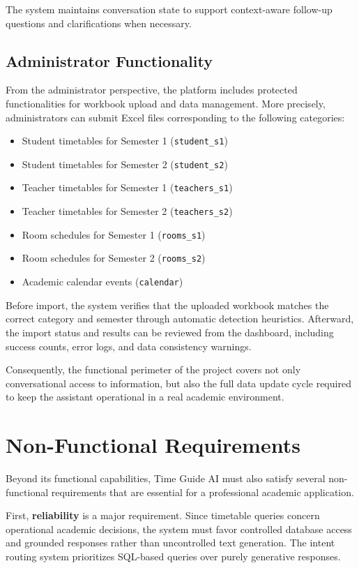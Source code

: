 The system maintains conversation state to support context-aware follow-up questions and clarifications when necessary.

\subsection{Administrator Functionality}
From the administrator perspective, the platform includes protected functionalities for workbook upload and data management. More precisely, administrators can submit Excel files corresponding to the following categories:

\begin{itemize}
    \item Student timetables for Semester 1 (\texttt{student\_s1})
    \item Student timetables for Semester 2 (\texttt{student\_s2})
    \item Teacher timetables for Semester 1 (\texttt{teachers\_s1})
    \item Teacher timetables for Semester 2 (\texttt{teachers\_s2})
    \item Room schedules for Semester 1 (\texttt{rooms\_s1})
    \item Room schedules for Semester 2 (\texttt{rooms\_s2})
    \item Academic calendar events (\texttt{calendar})
\end{itemize}

Before import, the system verifies that the uploaded workbook matches the correct category and semester through automatic detection heuristics. Afterward, the import status and results can be reviewed from the dashboard, including success counts, error logs, and data consistency warnings.

Consequently, the functional perimeter of the project covers not only conversational access to information, but also the full data update cycle required to keep the assistant operational in a real academic environment.

\section{Non-Functional Requirements}
Beyond its functional capabilities, Time Guide AI must also satisfy several non-functional requirements that are essential for a professional academic application.

First, \textbf{reliability} is a major requirement. Since timetable queries concern operational academic decisions, the system must favor controlled database access and grounded responses rather than uncontrolled text generation. The intent routing system prioritizes SQL-based queries over purely generative responses.

